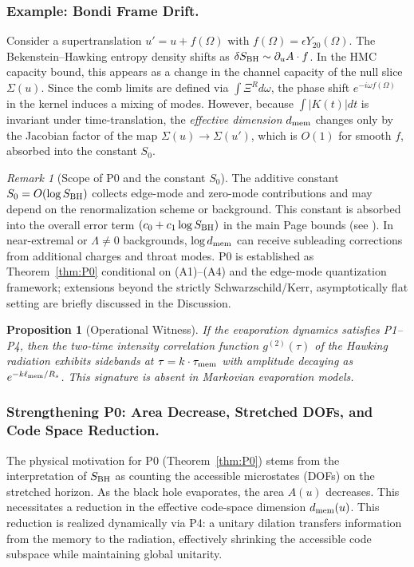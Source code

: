 \documentclass[11pt,a4paper]{article}
\theoremstyle{plain}
\newtheorem{proposition}[theorem]{Proposition}
\theoremstyle{definition}
\theoremstyle{remark}
\newtheorem{remark}[theorem]{Remark}
\begin{document}
\subsubsection{Example: Bondi Frame Drift.}
Consider a supertranslation $u' = u + f(\Omega)$ with $f(\Omega) = \epsilon Y_{20}(\Omega)$.
The Bekenstein--Hawking entropy density shifts as $\delta S_{\rm BH} \sim \partial_u A \cdot f$.
In the HMC capacity bound, this appears as a change in the channel capacity of the null slice $\Sigma(u)$.
Since the comb limits are defined via $\int \Xi^R d\omega$, the phase shift $e^{-i\omega f(\Omega)}$ in the kernel induces a mixing of modes.
However, because $\int |K(t)| dt$ is invariant under time-translation, the \emph{effective dimension} $d_{\rm mem}$ changes only by the Jacobian factor of the map $\Sigma(u) \to \Sigma(u')$, which is $O(1)$ for smooth $f$, absorbed into the constant $S_0$.

\begin{remark}[Scope of P0 and the constant $S_0$]\label{rem:scope_P0}
The additive constant $S_0=O(\log S_{\rm BH})$ collects edge-mode and zero-mode contributions and may depend on the renormalization scheme or background. This constant is absorbed into the overall error term $(c_0 + c_1\log S_{\rm BH})$ in the main Page bounds (see ).
In near-extremal or $\Lambda\!\neq\!0$ backgrounds, $\log d_{\rm mem}$ can receive subleading corrections from additional charges and throat modes.
P0 is established as Theorem~\ref{thm:P0} conditional on (A1)--(A4) and the edge-mode quantization framework; extensions beyond the strictly Schwarzschild/Kerr, asymptotically flat setting are briefly discussed in the Discussion.
\end{remark}

\begin{proposition}[Operational Witness]\label{prop:operational-witness}
If the evaporation dynamics satisfies P1--P4, then the two-time intensity correlation function $g^{(2)}(\tau)$ of the Hawking radiation exhibits sidebands at $\tau = k \cdot \tau_{\rm mem}$ with amplitude decaying as $e^{-k \ell_{\rm mem}/R_s}$. This signature is absent in Markovian evaporation models.
\end{proposition}
\subsubsection{Strengthening P0: Area Decrease, Stretched DOFs, and Code Space Reduction.}
The physical motivation for P0 (Theorem~\ref{thm:P0}) stems from the interpretation of $S_{\rm BH}$ as counting the accessible microstates (DOFs) on the stretched horizon. As the black hole evaporates, the area $A(u)$ decreases. This necessitates a reduction in the effective code-space dimension $d_{\rm mem}(u)$. This reduction is realized dynamically via P4: a unitary dilation transfers information from the memory to the radiation, effectively shrinking the accessible code subspace while maintaining global unitarity.
\end{document}
